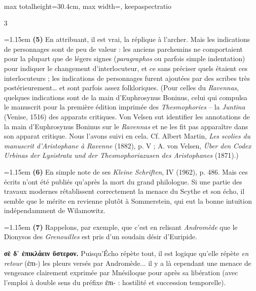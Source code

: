 \documentclass[11pt,twoside]{book}
\newcommand{\italique}[1]{\textit{#1}}
\begin{document}
\begin{adjustbox}{max totalheight=30.4cm, max width=\textwidth, keepaspectratio}
\begin{minipage}{\textwidth}
{\begin{multicols}{3}
\par\vspace{1.5pt}
\noindent\hangindent=1.15em {\color{sepiaNote}\textbf{(5)}} En attribuant, il est vrai, la réplique à l'archer. Mais les indications de personnages sont de peu de valeur : les anciens parchemins ne comportaient pour la plupart que de légers signes (\italique{paragraphos} ou parfois simple indentation) pour indiquer le changement d'interlocuteur, et ce sans préciser quels étaient ces interlocuteurs ; les indications de personnages furent ajoutées par des scribes très postérieurement… et sont parfois assez folkloriques. (Pour celles du \italique{Ravennas}, quelques indications sont de la main d'Euphrosynus Boninus, celui qui compulsa le manuscrit pour la première édition imprimée des \italique{Thesmophories} -- la \italique{Juntina} (Venise, 1516) des apparats critiques. Von Velsen sut identifier les annotations de la main d'Euphrosynus Boninus sur le \italique{Ravennas} et ne les fit pas apparaître dans son apparat critique. Nous l'avons suivi en cela. Cf. Albert Martin, \italique{Les scolies du manuscrit d'Aristophane à Ravenne} (1882), p. V ; A. von Velsen, \italique{Über den Codex Urbinas der Lysistrata und der Thesmophoriazusen des Aristophanes} (1871).)
\par\vspace{1.5pt}
\noindent\hangindent=1.15em {\color{sepiaNote}\textbf{(6)}} En simple note de ses \italique{Kleine Schriften}, IV (1962), p. 486. Mais ces écrits n'ont été publiés qu'après la mort du grand philologue. Si une partie des travaux modernes rétablissent correctement la menace du Scythe et son écho, il semble que le mérite en revienne plutôt à Sommerstein, qui eut la bonne intuition indépendamment de Wilamowitz.
\par\vspace{1.5pt}
\noindent\hangindent=1.15em {\color{sepiaNote}\textbf{(7)}} Rappelons, par exemple, que c'est en relisant \italique{Andromède} que le Dionysos des \italique{Grenouilles} est pris d'un soudain désir d'Euripide.
\par\vspace{1.5pt}
 \textbf{σὲ δ᾽ ἐπικλάειν ὕστερον.} Puisqu'Écho répète tout, il est logique qu'elle répète \italique{en retour} (ἐπι-) les pleurs versés par Andromède... il y a là cependant une menace de vengeance clairement exprimée par Mnésiloque pour après sa libération (avec l'emploi à double sens du préfixe ἐπι- : hostilité et succession temporelle).

\end{multicols}}
\end{minipage}
\end{adjustbox}
\end{document}
